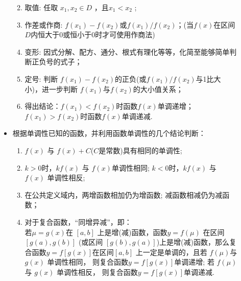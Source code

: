 \begin{description}
\begin{itemize}[leftmargin=*]
        \begin{enumerate}[label=\circled{\arabic*}]
          \kaishu
          \item 取值: 任取 $x_1,x_2\in D$ ，且$x_1<x_2$ ;
          \item 作差或作商: $f(x_1)-f(x_2)$或$f(x_1)/f(x_2)$；(当$f(x)$在区间$D$内恒大于0或恒小于0时才可使用作商法)
          \item 变形: 因式分解、配方、通分、根式有理化等等，化简至能够简单判断正负号的式子； \item 定号: 判断 $f(x_1)-f(x_2)$的正负(或$f(x_1)/f(x_2)$与1比大小)，进一步判断 $f(x_1)$与$f(x_2)$的大小值关系；
          \item 得出结论：$f(x_1)<f(x_2)$时函数$f(x)$单调递增；$f(x_1)>f(x_2)$时函数$f(x)$单调递减.
        \end{enumerate}
      \item 根据单调性已知的函数，并利用函数单调性的几个结论判断：
        \begin{enumerate}[label=\circled{\arabic*}]
          \kaishu
          \item $f(x)$ 与 $f(x)+C$($C$是常数)具有相同的单调性;
          \item $k>0$时，$k f(x)$ 与 $f(x) $单调性相同; $k<0$时，$k f(x)$ 与 $f(x)$ 单调性相反;
          \item 在公共定义域内，两增函数相加仍为增函数; 减函数相减仍为减函数；
          \item 对于复合函数，“同增异减”，即：\\
          若$\mu=g(x)$在 $[a , b]$ 上是增(减)函数，函数$y=f(\mu)$ 在区间 $[g(a) , g(b)]$ (或区间 $[g(b) , g(a)]$)上是增(减)函数，那么复合函数$y=f[g(x)]$在区间$[a , b]$ 上一定是单调的，且若 $f(\mu ) $与 $g(x)$ 单调性相同， 则复合函数$y=f[g(x)]$单调递增; 若 $f(\mu ) $与 $g(x)$ 单调性相反， 则复合函数$y=f[g(x)]$单调递减.
        \end{enumerate}
    \end{itemize}
  \end{description}
